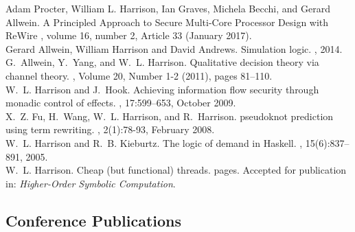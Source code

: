 \documentclass[12pt]{article} %
\begin{document}
Adam Procter, William L. Harrison, Ian Graves, Michela Becchi, and Gerard Allwein.
\newblock A Principled Approach to Secure Multi-Core Processor Design with ReWire
, volume 16, number 2, Article 33 (January 2017).
\\

Gerard Allwein, William Harrison and David Andrews.
\newblock Simulation logic.
, 2014.
\\

G.~Allwein, Y.~Yang, and W.~L. Harrison.
\newblock Qualitative decision theory via channel theory.
, Volume 20, Number 1-2 (2011), pages 81--110.
\\


W.~L. Harrison and J.~Hook.
\newblock Achieving information flow security through monadic control of
  effects.
, 17:599--653, October 2009.
\\

X.~Z. Fu, H.~Wang, W.~L. Harrison, and R.~Harrison.
 pseudoknot prediction using term rewriting.
, 2(1):78-93, February 2008.
\\


W.~L. Harrison and R.~B. Kieburtz.
\newblock The logic of demand in {H}askell.
, 15(6):837--891, 2005.
\\


W.~L. Harrison.
\newblock Cheap (but functional) threads.
 pages. Accepted for publication in: {\em Higher-Order Symbolic Computation}. 

\subsection*{Conference Publications}
\end{document}
